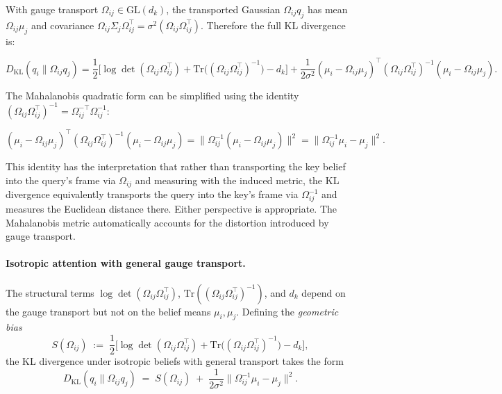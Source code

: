 \documentclass[twoside,11pt]{article}
\begin{document}
With gauge transport $\Omega_{ij} \in \mathrm{GL}(d_k)$, the transported Gaussian $\Omega_{ij}q_j$ has mean $\Omega_{ij}\mu_j$ and covariance $\Omega_{ij}\Sigma_j\Omega_{ij}^\top = \sigma^2(\Omega_{ij}\Omega_{ij}^\top)$. Therefore the full KL divergence is:

\begin{equation}
D_{\mathrm{KL}}(q_i \| \Omega_{ij}q_j) = \frac{1}{2}\Big[\log\det(\Omega_{ij}\Omega_{ij}^\top) + \mathrm{Tr}\big((\Omega_{ij}\Omega_{ij}^\top)^{-1}\big) - d_k\Big] + \frac{1}{2\sigma^2}(\mu_i - \Omega_{ij}\mu_j)^\top(\Omega_{ij}\Omega_{ij}^\top)^{-1}(\mu_i - \Omega_{ij}\mu_j).
\end{equation}

The Mahalanobis quadratic form can be simplified using the identity $(\Omega_{ij}\Omega_{ij}^\top)^{-1} = \Omega_{ij}^{-\top}\Omega_{ij}^{-1}$:

\begin{equation}
(\mu_i - \Omega_{ij}\mu_j)^\top(\Omega_{ij}\Omega_{ij}^\top)^{-1}(\mu_i - \Omega_{ij}\mu_j) = \|\Omega_{ij}^{-1}(\mu_i - \Omega_{ij}\mu_j)\|^2 = \|\Omega_{ij}^{-1}\mu_i - \mu_j\|^2.
\label{eq:mahalanobis_identity}
\end{equation}

This identity has the interpretation that rather than transporting the key belief into the query's frame via $\Omega_{ij}$ and measuring with the induced metric, the KL divergence equivalently transports the query into the key's frame via $\Omega_{ij}^{-1}$ and measures the Euclidean distance there. Either perspective is appropriate.  The Mahalanobis metric automatically accounts for the distortion introduced by gauge transport. 

\paragraph{Isotropic attention with general gauge transport.}

The structural terms $\log\det(\Omega_{ij}\Omega_{ij}^\top)$, $\mathrm{Tr}((\Omega_{ij}\Omega_{ij}^\top)^{-1})$, and $d_k$ depend on the gauge transport but not on the belief means $\mu_i, \mu_j$. Defining the \emph{geometric bias}
\begin{equation}
S(\Omega_{ij}) \;:=\; \frac{1}{2}\Big[\log\det(\Omega_{ij}\Omega_{ij}^\top) + \mathrm{Tr}\big((\Omega_{ij}\Omega_{ij}^\top)^{-1}\big) - d_k\Big],
\label{eq:geometric_bias}
\end{equation}
the KL divergence under isotropic beliefs with general transport takes the form
\begin{equation}
D_{\mathrm{KL}}(q_i \| \Omega_{ij} q_j) \;=\; S(\Omega_{ij}) \;+\; \frac{1}{2\sigma^2}\|\Omega_{ij}^{-1}\mu_i - \mu_j\|^2.
\label{eq:isotropic_general_omega}
\end{equation}
\end{document}

